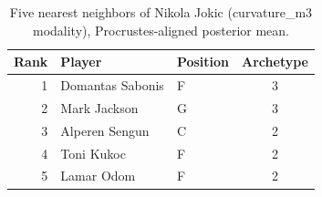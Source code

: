 \begin{table}[htbp]
  \centering\small
  \begin{tabular}{rllc}
    \toprule
    Rank & Player & Position & Archetype \\
    \midrule
    1 & Domantas Sabonis & F & 3 \\
    2 & Mark Jackson & G & 3 \\
    3 & Alperen Sengun & C & 2 \\
    4 & Toni Kukoc & F & 2 \\
    5 & Lamar Odom & F & 2 \\
    \bottomrule
  \end{tabular}
  \caption{Five nearest neighbors of Nikola Jokic (curvature_m3 modality), Procrustes-aligned posterior mean.}
  \label{tab:Nikola_Jokic_neighbors_curvature_m3}
\end{table}

